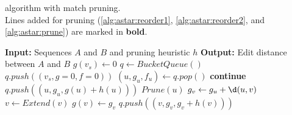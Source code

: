 \begin{algorithm}[b]
  \caption{
    \A algorithm with match pruning.\\
    Lines added for pruning
    (\ref{alg:astar:reorder1}, \ref{alg:astar:reorder2}, and \ref{alg:astar:prune})
    are marked in \textbf{bold}.
  }\label{alg:astar}
\fontfamily{\sfdefault}\selectfont
\begin{algorithmic}[1]
\State \textbf{Input:} Sequences $A$ and $B$ and pruning heuristic $h$
\State \textbf{Output:} Edit distance between $A$ and $B$
\State $g(v_s) \gets 0$
\State $q \gets BucketQueue()$
\State $q.push((v_s, g{=}0, f{=}0))$
\Repeat
  \State $(u, g_u, f_u) \gets q.pop()$
    \State \textbf{continue}
  \boldnext
    \label{alg:astar:reorder1}
  \boldnext
    \State $q.push((u, g_u, g(u) + h(u)))$
    \label{alg:astar:reorder2}
  \Else
  \boldnext
  \State $Prune(u)$
    \label{alg:astar:prune}
     \State $g_v \gets g_u + \d(u, v)$
     \State $v \gets Extend(v)$
       \label{alg:astar:open}
       \State $g(v) \gets g_v$
       \State $q.push((v, g_v, g_v + h(v)))$
     \EndIf
   \EndFor
   \EndIf
{}
\State {}
\EndFunction
\end{algorithmic}
\end{algorithm}
